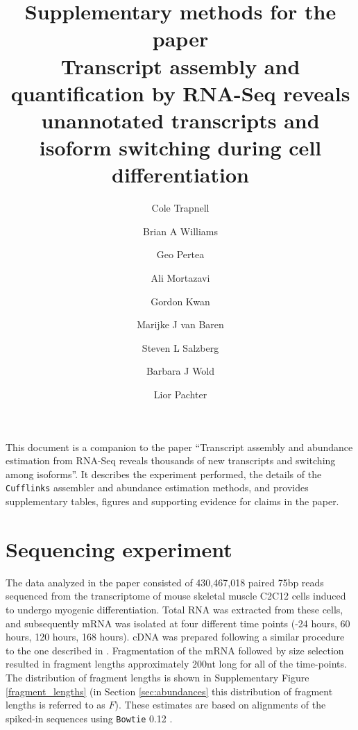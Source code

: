 \documentclass[12pt]{amsart}
\theoremstyle{definition}
\begin{document}
\title{Supplementary methods for the paper\\
Transcript assembly and quantification by RNA-Seq 
reveals unannotated transcripts and isoform switching 
during cell differentiation}
\author{Cole Trapnell \and Brian A Williams \and Geo Pertea \and Ali Mortazavi \and Gordon Kwan \and Marijke J van Baren \and Steven L Salzberg
\and Barbara J Wold \and Lior Pachter}


\maketitle
{}

This document is a companion to the paper ``Transcript assembly and abundance estimation from RNA-Seq reveals thousands of new transcripts and switching among isoforms''. It describes the experiment
performed, the details of the {\tt Cufflinks} assembler and abundance
estimation methods, and provides
supplementary tables, figures and supporting evidence for claims in
the paper.
 \tableofcontents \listoffigures \listoftables \newpage {}

\section{Sequencing experiment}

The data analyzed in the paper consisted of 430,467,018 paired 75bp reads
sequenced from the transcriptome of mouse skeletal muscle C2C12 cells induced
to undergo myogenic differentiation. Total RNA was extracted from these cells,
and subsequently mRNA was isolated at four different time points (-24 hours,
60 hours, 120 hours, 168 hours). cDNA was prepared following a similar
procedure to the one described in \cite{Mortazavi2008}. Fragmentation of the
mRNA followed by size selection resulted in fragment lengths
approximately 200nt long for
all of the time-points. The distribution of fragment lengths is shown in
Supplementary Figure \ref{fragment_lengths} (in Section \ref{sec:abundances}
this distribution of fragment lengths is referred to as $F$). These estimates
are based on alignments of the spiked-in sequences using {\tt Bowtie} 0.12
\cite{Langmead2009}.
\end{document}
